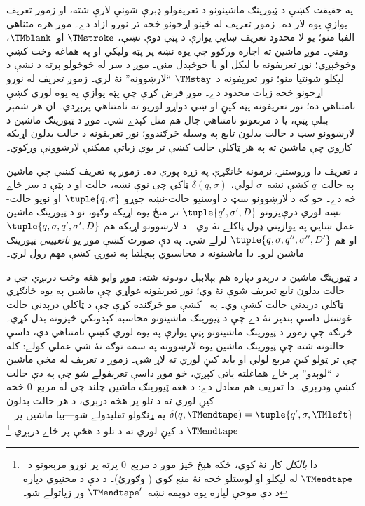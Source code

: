 \documentclass[../../../include/open-logic-section]{subfiles}
\begin{document}

په حقيقت کښې د ټيورينګ ماشينونو د تعريفولو ډېرې شونې لارې شته، او
زموږ تعريف يوازې يوه لار ده۔ زموږ تعريف له ځينو اړخونو څخه تر نورو
ازاد دے۔ موږ هره متناهي الفبا منو؛ يو لا محدود تعريف ښايي يوازې د
پټې دوې نښې، $\TMstroke$ او~$\TMblank$، ومني۔ موږ ماشين ته اجازه
ورکوو چې يوه نښه پر پټه وليکي او په هماغه وخت کښې وخوځېږي؛ نور
تعريفونه يا ليکل او يا خوځېدل مني۔ موږ د سر له خوځولو پرته د نښې د
ليکلو شونتيا منو؛ نور تعريفونه د~$\TMstay$ ``لارښوونه'' نۀ لري۔ زموږ
تعريف له نورو اړخونو څخه زيات محدود دے۔ موږ فرض کړې چې پټه يوازې په
يوه لوري کښې نامتناهي ده؛ نور تعريفونه پټه کيڼ او ښي دواړو لوريو ته
نامتناهي پرېږدي۔ ان هر شمېر بېلې پټې، يا د مربعونو نامتناهي جال هم
منل کېدے شي۔ موږ د ټيورينګ ماشين د لارښوونو سټ د حالت بدلون تابع په
وسيله څرګندوو؛ نور تعريفونه د حالت بدلون اړيکه کاروي چې ماشين ته په
هر ټاکلي حالت کښې تر يوې زياتې ممکنې لارښوونې ورکوي۔

د تعريف دا وروستنۍ نرمونه ځانګړې په زړه پورې ده۔ زموږ په تعريف کښې
چې ماشين په حالت~$q$ کښې نښه~$\sigma$ لولي، $\delta(q, \sigma)$
ټاکي چې نوې نښه، حالت او د پټې د سر ځاے څه دے۔ خو که د لارښوونو سټ
د اوسنيو حالت-نښه جوړو $\tuple{q,
  \sigma}$ او نويو حالت-نښه-لوري درې‌يزونو $\tuple{q', \sigma',
  D}$ تر منځ يوه اړيکه وګڼو، نو د ټيورينګ ماشين عمل ښايي په يوازيني
ډول ټاکلے نۀ وي---د لارښوونو اړيکه هم $\tuple{q,
  \sigma, q', \sigma', D}$ او هم $\tuple{q, \sigma, q'', \sigma'', D'}$
لرلے شي۔ په دې صورت کښې موږ يو \emph{ناتعييني} ټيورينګ ماشين لرو۔
دا ماشينونه د محاسبوي پېچلتيا په تيورۍ کښې مهم رول لري۔

د ټيورينګ ماشين د درېدو دپاره هم بېلابېل دودونه شته: موږ وايو هغه
وخت درېږي چې د حالت بدلون تابع تعريف شوې نۀ وي؛ نور تعريفونه غواړي
چې ماشين په يوه ځانګړي ټاکلي درېدني حالت کښې وي۔ په~
کښې مو څرګنده کړې چې د ټاکلي درېدني حالت غوښتل داسې بنديز نۀ دے چې
د ټيورينګ ماشينونو محاسبه کېدونکي څيزونه بدل کړي۔ څرنګه چې زموږ د
ټيورينګ ماشينونو پټې يوازې په يوه لوري کښې نامتناهي دي، داسې حالتونه
شته چې ټيورينګ ماشين يوه لارښوونه په سمه توګه نۀ شي عملي کولے: کله
چې تر ټولو کيڼ مربع لولي او بايد کيڼ لوري ته لاړ شي۔ زموږ د تعريف له
مخې ماشين د ``لوېدو'' پر ځاے هماغلته پاتې کېږي، خو موږ داسې تعريفولے
شو چې په دې حالت کښې ودرېږي۔ دا تعريف هم معادل دے: د هغه ټيورينګ
ماشين چلند چې له مربع~$0$ څخه کيڼ لوري ته د تلو پر هڅه درېږي، د هر
حالت بدلون $\delta(q,\TMendtape) =
\tuple{q',\sigma,\TMleft}$ په ړنګولو تقليدولے شو---بيا ماشين پر
~$\TMendtape$ د کيڼ لوري ته د تلو د هڅې پر ځاے درېږي۔\footnote{دا
\emph{بالکل} کار نۀ کوي، ځکه هېڅ څيز موږ د مربع~$0$ پرته پر نورو
مربعونو د~$\TMendtape$ له ليکلو او لوستلو څخه نۀ منع کوي
( وګورئ)۔ د دې د مخنيوي دپاره د دې موخې لپاره
يوه دويمه نښه~$\TMendtape'$ ور زياتولے شو۔}
\end{document}
